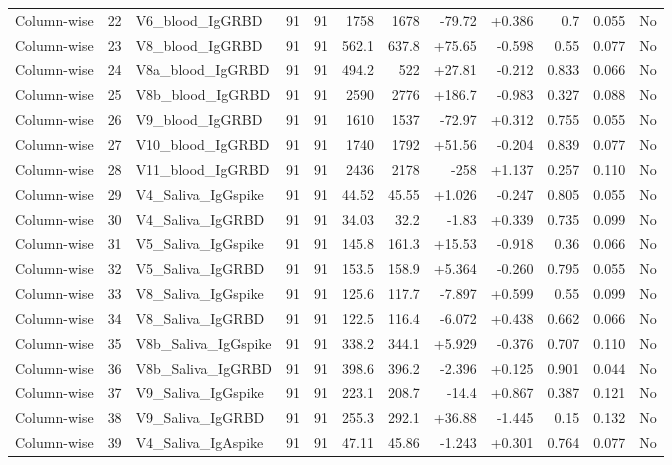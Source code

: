 \begin{landscape}
\begin{longtable}{@{}lrp{4.0cm}rrrrrrrrr@{}}
Column-wise & 22 & V6\_blood\_IgGRBD & 91 & 91 & 1758 & 1678 & -79.72 & +0.386 & 0.7 & 0.055 & No \\
Column-wise & 23 & V8\_blood\_IgGRBD & 91 & 91 & 562.1 & 637.8 & +75.65 & -0.598 & 0.55 & 0.077 & No \\
Column-wise & 24 & V8a\_blood\_IgGRBD & 91 & 91 & 494.2 & 522 & +27.81 & -0.212 & 0.833 & 0.066 & No \\
Column-wise & 25 & V8b\_blood\_IgGRBD & 91 & 91 & 2590 & 2776 & +186.7 & -0.983 & 0.327 & 0.088 & No \\
Column-wise & 26 & V9\_blood\_IgGRBD & 91 & 91 & 1610 & 1537 & -72.97 & +0.312 & 0.755 & 0.055 & No \\
Column-wise & 27 & V10\_blood\_IgGRBD & 91 & 91 & 1740 & 1792 & +51.56 & -0.204 & 0.839 & 0.077 & No \\
Column-wise & 28 & V11\_blood\_IgGRBD & 91 & 91 & 2436 & 2178 & -258 & +1.137 & 0.257 & 0.110 & No \\
Column-wise & 29 & V4\_Saliva\_IgGspike & 91 & 91 & 44.52 & 45.55 & +1.026 & -0.247 & 0.805 & 0.055 & No \\
Column-wise & 30 & V4\_Saliva\_IgGRBD & 91 & 91 & 34.03 & 32.2 & -1.83 & +0.339 & 0.735 & 0.099 & No \\
Column-wise & 31 & V5\_Saliva\_IgGspike & 91 & 91 & 145.8 & 161.3 & +15.53 & -0.918 & 0.36 & 0.066 & No \\
Column-wise & 32 & V5\_Saliva\_IgGRBD & 91 & 91 & 153.5 & 158.9 & +5.364 & -0.260 & 0.795 & 0.055 & No \\
Column-wise & 33 & V8\_Saliva\_IgGspike & 91 & 91 & 125.6 & 117.7 & -7.897 & +0.599 & 0.55 & 0.099 & No \\
Column-wise & 34 & V8\_Saliva\_IgGRBD & 91 & 91 & 122.5 & 116.4 & -6.072 & +0.438 & 0.662 & 0.066 & No \\
Column-wise & 35 & V8b\_Saliva\_IgGspike & 91 & 91 & 338.2 & 344.1 & +5.929 & -0.376 & 0.707 & 0.110 & No \\
Column-wise & 36 & V8b\_Saliva\_IgGRBD & 91 & 91 & 398.6 & 396.2 & -2.396 & +0.125 & 0.901 & 0.044 & No \\
Column-wise & 37 & V9\_Saliva\_IgGspike & 91 & 91 & 223.1 & 208.7 & -14.4 & +0.867 & 0.387 & 0.121 & No \\
Column-wise & 38 & V9\_Saliva\_IgGRBD & 91 & 91 & 255.3 & 292.1 & +36.88 & -1.445 & 0.15 & 0.132 & No \\
Column-wise & 39 & V4\_Saliva\_IgAspike & 91 & 91 & 47.11 & 45.86 & -1.243 & +0.301 & 0.764 & 0.077 & No \\

\end{longtable}
\end{landscape}
